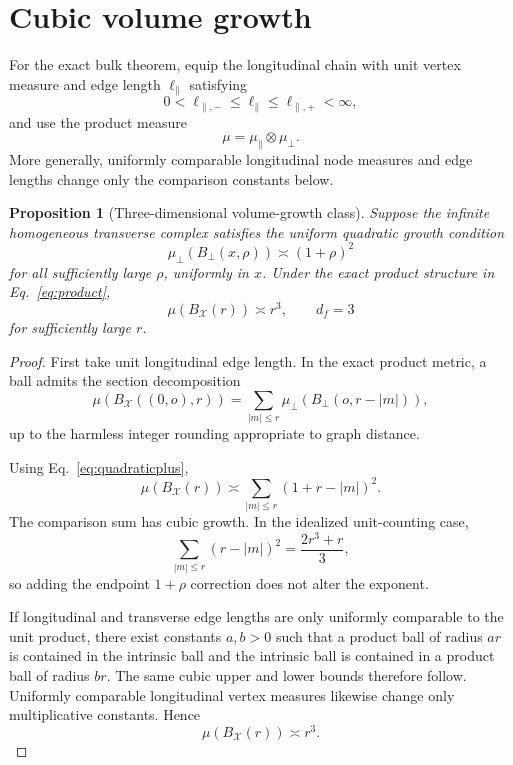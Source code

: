 \documentclass[11pt]{article}
\newtheorem{proposition}{Proposition}
\newcommand{\cX}{\mathcal{X}}
\begin{document}
\section{Cubic volume growth}

For the exact bulk theorem, equip the longitudinal chain with unit vertex measure and edge length \(\ell_\parallel\) satisfying
\[
0<\ell_{\parallel,-}\le \ell_\parallel\le \ell_{\parallel,+}<\infty,
\]
and use the product measure
\begin{equation}
\mu=\mu_\parallel\otimes\mu_\perp.
\end{equation}
More generally, uniformly comparable longitudinal node measures and edge lengths change only the comparison constants below.

\begin{proposition}[Three-dimensional volume-growth class]
Suppose the infinite homogeneous transverse complex satisfies the uniform quadratic growth condition
\begin{equation}
\mu_\perp(B_\perp(x,\rho))
\asymp
(1+\rho)^2
\label{eq:quadraticplus}
\end{equation}
for all sufficiently large \(\rho\), uniformly in \(x\). Under the exact product structure in Eq.~\eqref{eq:product},
\begin{equation}
\boxed{
\mu(B_{\cX}(r))\asymp r^3,
\qquad d_f=3
}
\label{eq:df3}
\end{equation}
for sufficiently large \(r\).
\end{proposition}

\begin{proof}
First take unit longitudinal edge length. In the exact product metric, a ball admits the section decomposition
\begin{equation}
\mu(B_{\cX}((0,o),r))
=
\sum_{|m|\le r}
\mu_\perp
\left(
B_\perp(o,r-|m|)
\right),
\label{eq:ballslice}
\end{equation}
up to the harmless integer rounding appropriate to graph distance.

Using Eq.~\eqref{eq:quadraticplus},
\begin{equation}
\mu(B_{\cX}(r))
\asymp
\sum_{|m|\le r}
(1+r-|m|)^2.
\end{equation}
The comparison sum has cubic growth. In the idealized unit-counting case,
\begin{equation}
\sum_{|m|\le r}(r-|m|)^2
=
\frac{2r^3+r}{3},
\end{equation}
so adding the endpoint \(1+\rho\) correction does not alter the exponent.

If longitudinal and transverse edge lengths are only uniformly comparable to the unit product, there exist constants \(a,b>0\) such that a product ball of radius \(ar\) is contained in the intrinsic ball and the intrinsic ball is contained in a product ball of radius \(br\). The same cubic upper and lower bounds therefore follow. Uniformly comparable longitudinal vertex measures likewise change only multiplicative constants. Hence
\[
\mu(B_{\cX}(r))\asymp r^3.
\]

\end{proof}
\end{document}

